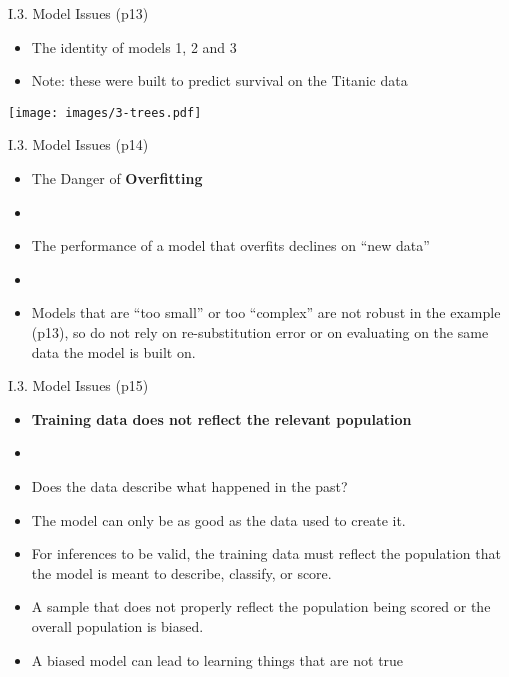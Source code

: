 \documentclass[handout]{beamer}
\newcommand{\strong}[1]{\textbf{\color{teal} #1}}
\newcommand{\stronger}[1]{\textbf{\color{purple} #1}}
\begin{document}
\begin{frame}{I.3. Model Issues (p13)}
\begin{itemize}
\item The identity of models 1, 2 and 3
\item Note: these were built to predict survival on the Titanic data
\end{itemize}
\begin{center}
\texttt{[image: images/3-trees.pdf]}
\end{center}
\end{frame}
\begin{frame}{I.3. Model Issues (p14)}
\begin{itemize}
\item[] The Danger of \stronger{Overfitting}
\item[]
\item The performance of a model that overfits declines on ``new data''
\item[]
\item Models that are ``too small'' or too ``complex'' are not robust in the example (p13), so do not rely on re-substitution error or on evaluating on the same data the model is built on.
\end{itemize}
\end{frame}
\begin{frame}{I.3. Model Issues (p15)}
\begin{itemize}
\item[] \strong{Training data does not reflect the relevant population}
\item[]
\item Does the data describe what happened in the past? 
\item The model can only be as good as the data used to create it. 
\item For inferences to be valid, the training data must reflect the population that the model is meant to describe, classify, or score. 
\item A sample that does not properly reflect the population being scored or the overall population is biased.
\item A biased model can lead to learning things that are not true
\end{itemize}
\end{frame}
\end{document}
